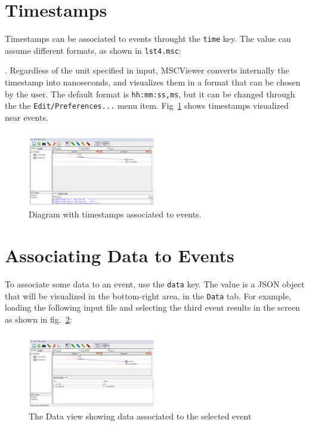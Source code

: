 \documentclass[11pt, twoside, titlepage]{book}
\newcommand{\prog}{MSCViewer}
\begin{document}
\section{Timestamps}
Timestamps can be associated to events throught the \texttt{time}
key. The value can assume different formats, as shown in \texttt{lst4.msc}:


.
Regardless of the unit specified in input, \prog{} converts internally the
timestamp into nanoseconds, and visualizes them in a format that can be chosen
by the user. The default format is \texttt{hh:mm:ss,ms}, but it can be 
changed through the the \texttt{Edit/Preferences...} menu item. Fig~\ref{fig:gui-lst4}
shows timestamps visualized near events.


\begin{figure}[ht!]
  \centering
  \includegraphics[width=0.5\textwidth,natwidth=1024,natheight=600]{images/gui-ex4-time.png}
  \caption{Diagram with timestamps associated to events.}
  \label{fig:gui-lst4}
\end{figure} 


\section{Associating Data to Events}
To associate some data to an event, use the \texttt{data} key. The value is a
JSON object that will be visualized in the bottom-right area, in the
\texttt{Data} tab. For example, loading the following input file  and selecting
the third event results in the screen as shown in fig.~\ref{fig:gui-lst5}:

\begin{minipage}{\linewidth} 

\end{minipage}


\begin{figure}[ht!]
  \centering
  \includegraphics[width=0.5\textwidth,natwidth=1024,natheight=600]{images/gui-ex5-data.png}
  \caption{The Data view showing data associated to the selected event}
  \label{fig:gui-lst5}
\end{figure}
\end{document}
